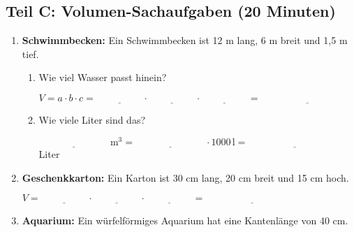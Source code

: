 \subsection*{Teil C: Volumen-Sachaufgaben (20 Minuten)}

\begin{enumerate}[label=\arabic*.]
    \item \textbf{Schwimmbecken:}
    Ein Schwimmbecken ist 12 m lang, 6 m breit und 1{,}5 m tief.
    \vspace{0.5cm}

    \begin{enumerate}[label=\alph*)]
        \item Wie viel Wasser passt hinein?

        $V = a \cdot b \cdot c = \underline{\hspace{2cm}} \cdot \underline{\hspace{2cm}} \cdot \underline{\hspace{2cm}} = \underline{\hspace{4cm}}$

        \vspace{0.5cm}

        \item Wie viele Liter sind das?

        $\underline{\hspace{3cm}}\,\text{m}^3 = \underline{\hspace{3cm}} \cdot 1000\,\text{l} = \underline{\hspace{4cm}}$ Liter
    \end{enumerate}

    \vspace{1cm}

    \item \textbf{Geschenkkarton:}
    Ein Karton ist 30 cm lang, 20 cm breit und 15 cm hoch.
    \vspace{0.5cm}

    $V = \underline{\hspace{2cm}} \cdot \underline{\hspace{2cm}} \cdot \underline{\hspace{2cm}} = \underline{\hspace{4cm}}$

    \vspace{1cm}

    \item \textbf{Aquarium:}
    Ein würfelförmiges Aquarium hat eine Kantenlänge von 40 cm.
    \vspace{0.5cm}


\end{enumerate}
